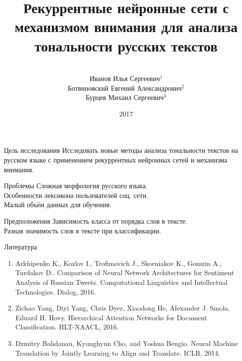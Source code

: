 \documentclass{beamer}
\title[\hbox to 56mm{\hfill\insertframenumber\,/\,\inserttotalframenumber}]
{Рекуррентные нейронные сети с механизмом внимания для анализа тональности русских текстов}
\author[И.\,С. Иванов]{\large \\Иванов Илья Сергеевич$^{1}$
\large \\Ботвиновский Евгений Александрович$^{2}$
\large \\Бурцев Михаил Сергеевич$^{3}$}
\institute{
$^{1}$студент, Московский Физико-Технический Институт\\
$^{2}$к.ф.-м.н., DeepHackLab\\
$^{3}$к.ф.-м.н., DeepHackLab\\
}
\date{2017}
\begin{document}
\nocite{*}
\begin{frame}
\titlepage
\end{frame}
\begin{frame}{Цель исследования}
Исследовать новые методы анализа тональности текстов на русском языке с применением рекуррентных нейронных сетей и механизма внимания.
\begin{block}{Проблемы}
	Сложная морфология русского языка.\\
	Особенности лексикона пользователей соц. сети.\\
	Малый объём данных для обучения.\\
\end{block}

\begin{block}{Предположения}
	Зависимость класса от порядка слов в тексте.\\
	Разная значимость слов в тексте при классификации.
\end{block}

\end{frame}
\begin{frame}{Литература}
	\begin{enumerate}
		\item Arkhipenko K., Kozlov I., Trofimovich J., Skorniakov K., Gomzin A., Turdakov D.. Comparison of Neural Network Architectures for Sentiment Analysis of Russian Tweets. Computational Linguistics and Intellectual Technologies. Dialog, 2016.	
		\item Zichao Yang, Diyi Yang, Chris Dyer, Xiaodong He, Alexander J. Smola, Eduard H. Hovy. Hierarchical Attention Networks for Document Classification. HLT-NAACL, 2016.
		\item Dzmitry Bahdanau, Kyunghyun Cho, and Yoshua Bengio. Neural Machine Translation by Jointly Learning to Align and Translate. ICLR, 2014.
	\end{enumerate}
\end{frame}
\end{document}

